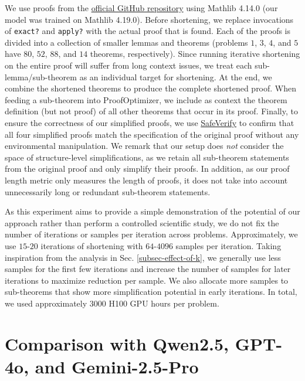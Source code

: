 We use proofs from the \href{https://github.com/ByteDance-Seed/Seed-Prover/tree/17f89e327e4f90f46b0af385efc233dbbe71f8bb/SeedProver/imo2025/IMO2025}{official GitHub repository} using Mathlib 4.14.0 (our model was trained on Mathlib 4.19.0). Before shortening, we replace invocations of \texttt{exact?} and \texttt{apply?} with the actual proof that is found. Each of the proofs is divided into a collection of smaller lemmas and theorems (problems $1$, $3$, $4$, and $5$ have $80$, $52$, $88$, and $14$ theorems, respectively). Since running iterative shortening on the entire proof will suffer from long context issues, we treat each sub-lemma/sub-theorem as an individual target for shortening. At the end, we combine the shortened theorems to produce the complete shortened proof. When feeding a sub-theorem into ProofOptimizer, we include as context the theorem definition (but not proof) of all other theorems that occur in its proof. Finally, to ensure the correctness of our simplified proofs, we use \href{https://github.com/GasStationManager/SafeVerify}{SafeVerify} to confirm that all four simplified proofs match the specification of the original proof without any environmental manipulation. We remark that our setup does \textit{not} consider the space of structure-level simplifications, as we retain all sub-theorem statements from the original proof and only simplify their proofs. In addition, as our proof length metric only measures the length of proofs, it does not take into account unnecessarily long or redundant sub-theorem statements. 

As this experiment aims to provide a simple demonstration of the potential of our approach rather than perform a controlled scientific study, we do not fix the number of iterations or samples per iteration across problems. Approximately, we use $15$-$20$ iterations of shortening with $64$-$4096$ samples per iteration. Taking inspiration from the analysis in Sec. \ref{subsec-effect-of-k}, we generally use less samples for the first few iterations and increase the number of samples for later iterations to maximize reduction per sample. We also allocate more samples to sub-theorems that show more simplification potential in early iterations. In total, we used approximately $3000$ H100 GPU hours per problem.

\newpage
\section{Comparison with Qwen2.5, GPT-4o, and Gemini-2.5-Pro} \label{subsec:leading-model-comparison}

